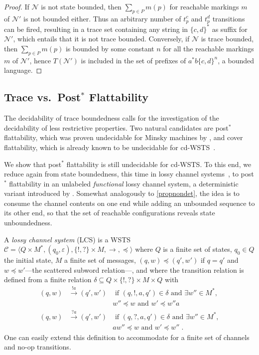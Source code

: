 \documentclass[11pt,reqno,a4paper]{amsart}
\newcommand{\tup}[1]{\langle #1\rangle}
\newcommand{\ru}[1]{\xrightarrow{#1}}
\renewcommand{\cite}{\citep}
\theoremstyle{plain}
\theoremstyle{definition}
\theoremstyle{remark}
\begin{document}
\begin{proof}
  If $\mathcal{N}$ is not state bounded, then $\sum_{p\in P}m(p)$ for
  reachable markings $m$ of $\mathcal{N}'$ is not bounded either.  Thus
  an arbitrary number of $t^c_p$ and $t^d_p$ transitions can be fired,
  resulting in a trace set containing any string in $\{c,d\}^\ast$ as
  suffix for $\mathcal{N}'$, which entails that it is not trace bounded.
  Conversely, if $\mathcal{N}$ is trace bounded, then $\sum_{p\in P}m(p)$ is
  bounded by some constant $n$ for all the reachable markings $m$ of
  $\mathcal{N}'$, hence $T(\mathcal{N}')$ is included in the set of
  prefixes of $a^\ast b\{c,d\}^n$, a bounded language. 
\end{proof}


\subsection{Trace vs.\ Post$^\ast$ Flattability}\label{sub:posta}
The decidability of trace boundedness calls for the investigation of the
decidability of less restrictive properties.  Two natural candidates
are post$^\ast$ flattability, which was proven undecidable for
Minsky machines by \citet{flataccel}, and cover flattability, which is
already known to be undecidable for cd-WSTS~\citep{cwsts2}.

We show that post$^\ast$ flattability is still undecidable for cd-WSTS.
To this end, we reduce again from state boundedness, this time in lossy
channel systems~\cite{lrpn}, to post$^\ast$ flattability in an
unlabeled \emph{functional} lossy channel system, a deterministic
variant introduced by \citet{cwsts1}.  Somewhat analogously to
\autoref{propnondet}, the idea is to consume the channel
contents on one end while adding an unbounded sequence to its other
end, so that the set of reachable configurations reveals state
unboundedness.

A \emph{lossy channel system} (LCS) is a WSTS
$\mathcal{C}=\tup{Q\times M^\ast,(q_0,\varepsilon),\{!,?\}\times
  M,{\rightarrow},{\preceq}}$ where $Q$ is a finite set of states,
$q_0\in Q$ the initial state, $M$ a finite set of messages,
$(q,w)\preceq(q',w')$ if $q=q'$ and $w\preceq w'$---the scattered
subword relation---, and where the transition relation is defined from
a finite relation $\delta\subseteq Q\times\{!,?\}\times M\times Q$
with
\begin{align*}
(q,w)&\ru{!a}(q',w')& \text{ if }(q,!,a,q')\in\delta\text{ and }\exists
  w''\in M^\ast,\\&& w''\preceq w\text{ and }w'\preceq w''a\\
(q,w)&\ru{?a}(q',w')& \text{ if }(q,?,a,q')\in\delta\text{ and }\exists
  w''\in M^\ast,\\&& aw''\preceq w\text{ and }w'\preceq w''\;.
\end{align*}
One can easily extend this definition to accommodate for a finite set of
channels and no-op transitions.
\end{document}

